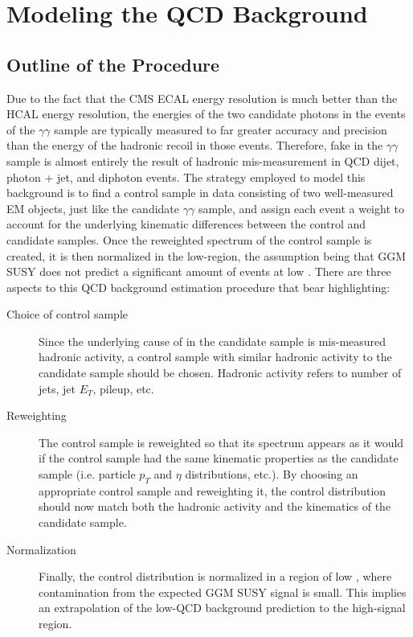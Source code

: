 \documentclass[dissertation.tex]{subfiles}
\begin{document}
\section{Modeling the QCD Background}
\label{sec:Modeling the QCD Background}

\subsection{Outline of the Procedure}
\label{sec:Outline of the Procedure}

Due to the fact that the CMS ECAL energy resolution is much better than the HCAL energy resolution, the energies of the two candidate photons in the events of the $\gamma\gamma$ sample are typically measured to far greater accuracy and precision than the energy of the hadronic recoil in those events.  Therefore, fake \MET in the $\gamma\gamma$ sample is almost entirely the result of hadronic mis-measurement in QCD dijet, photon + jet, and diphoton events.  The strategy employed to model this background is to find a control sample in data consisting of two well-measured EM objects, just like the candidate $\gamma\gamma$ sample, and assign each event a weight to account for the underlying kinematic differences between the control and candidate samples.  Once the reweighted \MET spectrum of the control sample is created, it is then normalized in the low-\MET region, the assumption being that GGM SUSY does not predict a significant amount of events at low \MET.  There are three aspects to this QCD background estimation procedure that bear highlighting:

\begin{description}
\item[Choice of control sample] Since the underlying cause of \MET in the candidate sample is mis-measured hadronic activity, a control sample with similar hadronic activity to the candidate sample should be chosen.  Hadronic activity refers to number of jets, jet $E_{T}$, pileup, etc.
\item[Reweighting] The control sample is reweighted so that its \MET spectrum appears as it would if the control sample had the same kinematic properties as the candidate sample (i.e. particle $p_{T}$ and $\eta$ distributions, etc.).  By choosing an appropriate control sample and reweighting it, the control \MET distribution should now match both the hadronic activity and the kinematics of the candidate sample.
\item[Normalization] Finally, the control \MET distribution is normalized in a region of low \MET, where contamination from the expected GGM SUSY signal is small.  This implies an extrapolation of the low-\MET QCD background prediction to the high-\MET signal region.
\end{description}
\end{document}
